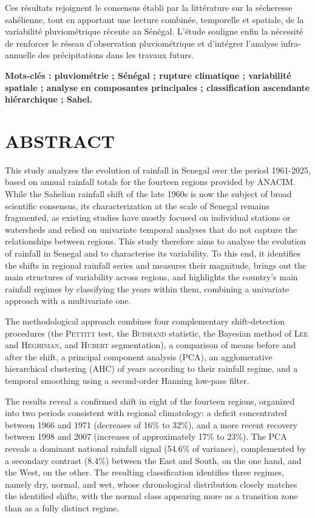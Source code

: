 \documentclass[12pt,a4paper]{report}
\begin{document}
Ces résultats rejoignent le consensus établi par la littérature sur la sécheresse sahélienne, tout en apportant une lecture combinée, temporelle et spatiale, de la variabilité pluviométrique récente au Sénégal. L'étude souligne enfin la nécessité de renforcer le réseau d'observation pluviométrique et d'intégrer l'analyse infra-annuelle des précipitations dans les travaux futurs.

\medskip
\noindent\textbf{Mots-clés : pluviométrie ; Sénégal ; rupture climatique ; variabilité spatiale ; analyse en composantes principales ; classification ascendante hiérarchique ; Sahel.}

\chapter*{ABSTRACT}

This study analyzes the evolution of rainfall in Senegal over the period 1961-2025, based on annual rainfall totals for the fourteen regions provided by ANACIM. While the Sahelian rainfall shift of the late 1960s is now the subject of broad scientific consensus, its characterization at the scale of Senegal remains fragmented, as existing studies have mostly focused on individual stations or watersheds and relied on univariate temporal analyses that do not capture the relationships between regions. This study therefore aims to analyse the evolution of rainfall in Senegal and to characterise its variability. To this end, it identifies the shifts in regional rainfall series and measures their magnitude, brings out the main structures of variability across regions, and highlights the country’s main rainfall regimes by classifying the years within them, combining a univariate approach with a multivariate one.

The methodological approach combines four complementary shift-detection procedures (the \textsc{Pettitt} test, the \textsc{Buishand} statistic, the Bayesian method of \textsc{Lee} and \textsc{Heghinian}, and \textsc{Hubert} segmentation), a comparison of means before and after the shift, a principal component analysis (PCA), an agglomerative hierarchical clustering (AHC) of years according to their rainfall regime, and a temporal smoothing using a second-order Hanning low-pass filter.

The results reveal a confirmed shift in eight of the fourteen regions, organized into two periods consistent with regional climatology: a deficit concentrated between 1966 and 1971 (decreases of 16\% to 32\%), and a more recent recovery between 1998 and 2007 (increases of approximately 17\% to 23\%). The PCA reveals a dominant national rainfall signal (54.6\% of variance), complemented by a secondary contrast (8.4\%) between the East and South, on the one hand, and the West, on the other. The resulting classification identifies three regimes, namely dry, normal, and wet, whose chronological distribution closely matches the identified shifts, with the normal class appearing more as a transition zone than as a fully distinct regime.
\end{document}
